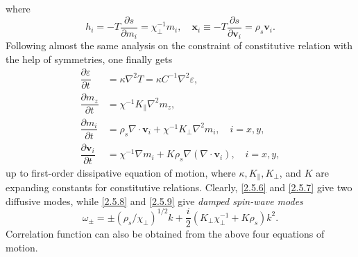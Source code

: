 \documentclass[10pt,nofootinbib]{revtex4}
\begin{document}
		where
		\begin{equation}\label{2.5.5}
			h_i=-T\dfrac{\partial s}{\partial m_i}=\chi_\perp^{-1}m_i,\quad \bm{x}_i\equiv-T\dfrac{\partial s}{\partial \bm{v}_i}=\rho_s\bm{v}_i.
		\end{equation}
		Following almost the same analysis on the constraint of constitutive relation with the help of symmetries, one finally gets
		\begin{align}
			\dfrac{\partial \varepsilon}{\partial t}&=\kappa\nabla^2T=\kappa C^{-1}\nabla^2 \varepsilon,\label{2.5.6}\\
			\dfrac{\partial m_z}{\partial t}&=\chi^{-1}K_\parallel\nabla^2 m_z,\label{2.5.7}\\
			\dfrac{\partial m_i}{\partial t}&=\rho_s\nabla\cdot\bm{v}_i+\chi^{-1}K_\perp\nabla^2 m_i,\quad i=x,y,\label{2.5.8}\\
			\dfrac{\partial \bm{v}_i}{\partial t}&=\chi^{-1}\nabla m_i+K\rho_s\nabla(\nabla\cdot\bm{v}_i),\quad i=x,y,\label{2.5.9}
		\end{align}
		up to first-order dissipative equation of motion, where $\kappa,K_\parallel,K_\perp$, and $K$ are expanding constants for constitutive relations. Clearly, \eqref{2.5.6} and \eqref{2.5.7} give two diffusive modes, while \eqref{2.5.8} and \eqref{2.5.9} give \emph{damped spin-wave modes}
		\begin{equation}\label{2.5.10}
			\omega_\pm=\pm(\rho_s/\chi_\perp)^{1/2}k+\dfrac{i}{2}(K_\perp\chi_\perp^{-1}+K\rho_s)k^2.
		\end{equation}
		Correlation function can also be obtained from the above four equations of motion.
\end{document}
